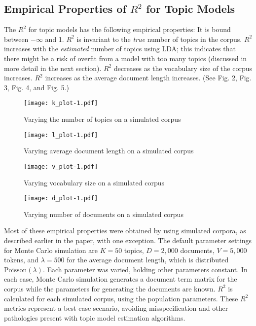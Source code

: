 \documentclass[conference,final,]{IEEEtran}
\makeatletter
\def\maxwidth{\ifdim\Gin@nat@width>\linewidth\linewidth
\else\Gin@nat@width\fi}
\let\Oldincludegraphics\includegraphics
\renewcommand{\includegraphics}[1]{\Oldincludegraphics[width=\maxwidth]{#1}}
\makeatother
\begin{document}
\hypertarget{empirical-properties-of-r2-for-topic-models}{%
\subsection{\texorpdfstring{Empirical Properties of \(R^2\) for Topic
Models}{Empirical Properties of R\^{}2 for Topic Models}}\label{empirical-properties-of-r2-for-topic-models}}

The \(R^2\) for topic models has the following empirical properties: It
is bound between \(-\infty\) and 1. \(R^2\) is invariant to the
\textit{true} number of topics in the corpus. \(R^2\) increases with the
\textit{estimated} number of topics using LDA; this indicates that there
might be a risk of overfit from a model with too many topics (discussed
in more detail in the next section). \(R^2\) decreases as the vocabulary
size of the corpus increases. \(R^2\) increases as the average document
length increases. (See Fig. 2, Fig. 3, Fig. 4, and Fig. 5.)

\begin{figure}
\centering
\texttt{[image: k\_plot-1.pdf]}
\caption{Varying the number of topics on a simulated corpus}
\end{figure}

\begin{figure}
\centering
\texttt{[image: l\_plot-1.pdf]}
\caption{Varying average document length on a simulated corpus}
\end{figure}

\begin{figure}
\centering
\texttt{[image: v\_plot-1.pdf]}
\caption{Varying vocabulary size on a simulated corpus}
\end{figure}

\begin{figure}
\centering
\texttt{[image: d\_plot-1.pdf]}
\caption{Varying number of documents on a simulated corpus}
\end{figure}

Most of these empirical properties were obtained by using simulated
corpora, as described earlier in the paper, with one exception. The
default parameter settings for Monte Carlo simulation are \(K = 50\)
topics, \(D = 2{,}000\) documents, \(V = 5{,}000\) tokens, and
\(\lambda = 500\) for the average document length, which is distributed
\(\text{Poisson}(\lambda)\). Each parameter was varied, holding other
parameters constant. In each case, Monte Carlo simulation generates a
document term matrix for the corpus while the parameters for generating
the documents are known. \(R^2\) is calculated for each simulated
corpus, using the population parameters. These \(R^2\) metrics represent
a best-case scenario, avoiding misspecification and other pathologies
present with topic model estimation algorithms.
\end{document}
